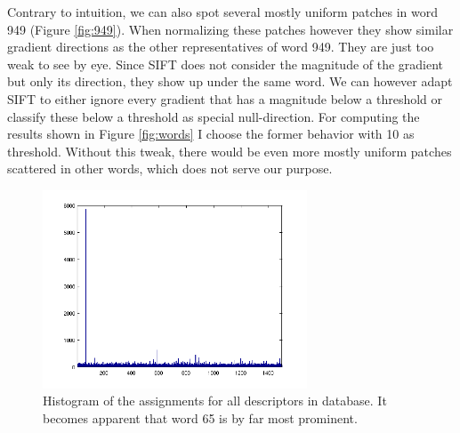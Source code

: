 \documentclass{paper}
\begin{document}
Contrary to intuition, we can also spot several mostly uniform patches in word 949
(Figure \ref{fig:949}). When normalizing these patches however they show similar 
gradient directions as the other representatives of word 949. They are just too weak to see
by eye. Since SIFT does not consider the magnitude of the gradient but only its direction,
they show up under the same word. We can however adapt SIFT to either ignore every 
gradient that has a magnitude below a threshold or classify these below a threshold as 
special null-direction. For computing the results shown in Figure \ref{fig:words} I 
choose the former behavior with 10 as threshold. 
Without this tweak, there would be even more mostly uniform patches scattered in other words,
which does not serve our purpose.
\begin{figure}
  \centering
  \includegraphics[width=0.7\textwidth]{hist_all}
  \caption{Histogram of the assignments for all descriptors in database. It becomes 
  apparent that word 65 is by far most prominent.}
  \label{fig:all_hist}
\end{figure}
\end{document}
